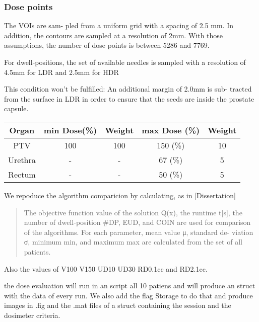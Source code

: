 \documentclass[12pt]{article}
\theoremstyle{definition}
\begin{document}
\subsubsection{Dose points}
The VOIs are sam- pled from a uniform grid with a spacing of 2.5 mm. In addition, the contours are sampled at a resolution of 2mm. With those assumptions, the number of dose points is between 5286 and 7769.\par
For dwell-positions, the set of available needles is sampled with a resolution of 4.5mm for LDR and 2.5mm for HDR\par
This condition won't be fulfilled: An additional margin of 2.0mm is sub- tracted from the surface in LDR in order to ensure that the seeds are inside the prostate capsule.
\begin{center}
\begin{tabular}{|c|c|c|c|c|}
\hline
Organ & min Dose(\%) & Weight & max Dose (\%) & Weight \\ 
\hline
PTV & 100 & 100 & 150 (\%) & 10 \\
Urethra & -  & - & 67 (\%) & 5 \\
Rectum & - & - & 50 (\%) & 5 \\
\hline
\end{tabular}
\end{center}
We repoduce the algorithm comparicion by calculating, as in [Dissertation] 
\begin{quote}
    The objective function value of the solution Q(x), the runtime t[s], the number of dwell-position #DP, EUD, and COIN are used for comparison of the algorithms. For each parameter, mean value μ, standard de- viation σ, minimum min, and maximum max are calculated from the set of all patients.
\end{quote}
Also the values of V100 V150 UD10 UD30 RD0.1cc and RD2.1cc.\par
the dose evaluation will run in an script all 10 patiens and will produce an struct with the data of every run. We also add the flag Storage to do that and produce images in .fig and the .mat files of a struct containing the session and the dosimeter criteria. 







\end{document}
